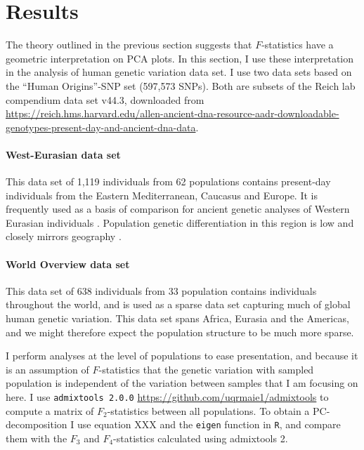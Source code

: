\documentclass[12pt,a4pape, fullpage]{article}
\begin{document}
	

\section{Results}
The theory outlined in the previous section suggests that $F$-statistics have a geometric interpretation on PCA plots. In this section, I use these interpretation in the analysis of human genetic variation data set. I use two data sets based on the ``Human Origins''-SNP set (597,573 SNPs). Both are subsets of the Reich lab compendium data set v44.3, downloaded from \url{https://reich.hms.harvard.edu/allen-ancient-dna-resource-aadr-downloadable-genotypes-present-day-and-ancient-dna-data}. 

\paragraph{West-Eurasian data set}
This data set of 1,119 individuals from 62 populations contains  present-day individuals from the Eastern Mediterranean, Caucasus and Europe. It is frequently used as a basis of comparison for ancient genetic analyses of Western Eurasian individuals \cite{patterson2012}. Population genetic differentiation in this region is low and closely mirrors geography \cite{novembre2008}. 

\paragraph{World Overview data set}
This data set of 638 individuals from 33 population contains individuals throughout the world, and is used as a sparse data set capturing much of global human genetic variation. This data set spans Africa, Eurasia and the Americas, and we might therefore expect the population structure to be much more sparse.

I perform analyses at the level of populations to ease presentation, and because it is an assumption of $F$-statistics that the genetic variation with sampled population is independent of the variation between samples that I am focusing on here. I use \texttt{admixtools 2.0.0} \url{https://github.com/uqrmaie1/admixtools} to compute a matrix of $F_2$-statistics between all populations. To obtain a PC-decomposition I use equation XXX and the \texttt{eigen} function in \texttt{R}, and compare them with the $F_3$ and $F_4$-statistics calculated using admixtools 2.
\end{document}

